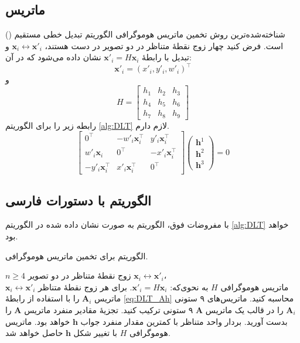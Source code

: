 \subsection{ماتریس}

شناخته‌شده‌ترین روش تخمین ماتریس هوموگرافی الگوریتم تبدیل خطی مستقیم () است.  فرض کنید چهار زوج نقطهٔ متناظر در دو تصویر در دست هستند،  $\mathbf{x}_i\leftrightarrow\mathbf{x}'_i$   و تبدیل با رابطهٔ
$\mathbf{x}'_i = H\mathbf{x}_i$
نشان داده می‌شود که در آن:
\[\mathbf{x}'_i=(x'_i,y'_i,w'_i)^\top  \]
و
\[ H=\left[
\begin{array}{ccc}
h_1 & h_2 & h_3 \\ 
h_4 & h_5 & h_6 \\ 
h_7 & h_8 & h_9
\end{array} 
\right]\]
رابطه زیر را برای الگوریتم  \eqref{alg:DLT} لازم دارم.
\begin{equation}\label{eq:DLT_Ah}
\left[
\begin{array}{ccc}
0^\top & -w'_i\mathbf{x}_i^\top & y'_i\mathbf{x}_i^\top \\ 
w'_i\mathbf{x}_i & 0^\top & -x'_i\mathbf{x}_i^\top \\ 
- y'_i\mathbf{x}_i^\top & x'_i\mathbf{x}_i^\top & 0^\top
\end{array} 
\right]
\left(
\begin{array}{c}
\mathbf{h}^1 \\ 
\mathbf{h}^2 \\ 
\mathbf{h}^3
\end{array} 
\right)=0
\end{equation}

\subsection{الگوریتم با دستورات فارسی}
با مفروضات فوق، الگوریتم  به صورت نشان داده شده در الگوریتم \eqref{alg:DLT}  خواهد بود.
\begin{algorithm}[t]
	\onehalfspacing
	\caption{الگوریتم  برای تخمین ماتریس هوموگرافی.} \label{alg:DLT}
	\begin{algorithmic}[1]
		\REQUIRE $n\geq4$ زوج نقطهٔ متناظر در دو تصویر 
		${\mathbf{x}_i\leftrightarrow\mathbf{x}'_i}$،\\
		\ENSURE ماتریس هوموگرافی $H$ به نحوی‌که: 
		$\mathbf{x}'_i = H \mathbf{x}_i$.
		\STATE برای هر زوج نقطهٔ متناظر
		$\mathbf{x}_i\leftrightarrow\mathbf{x}'_i$ 
		ماتریس $\mathbf{A}_i$ را با استفاده از رابطهٔ \ref{eq:DLT_Ah} محاسبه کنید.
		\STATE ماتریس‌های ۹ ستونی  $\mathbf{A}_i$ را در قالب یک ماتریس $\mathbf{A}$ ۹ ستونی ترکیب کنید. 
		\STATE تجزیهٔ مقادیر منفرد   ماتریس $\mathbf{A}$ را بدست آورید. بردار واحد متناظر با کمترین مقدار منفرد جواب $\mathbf{h}$ خواهد بود.
		\STATE  ماتریس هوموگرافی $H$ با تغییر شکل $\mathbf{h}$ حاصل خواهد شد.
	\end{algorithmic}
\end{algorithm}

